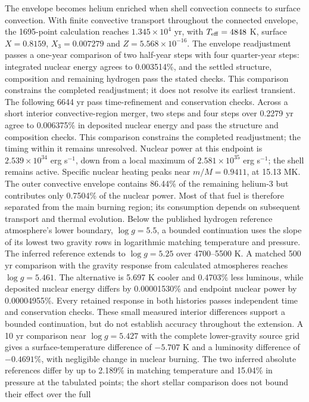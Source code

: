 \documentclass[11pt,letterpaper]{article}
\begin{document}
The envelope becomes helium enriched when shell convection connects to
surface convection. With finite convective transport throughout the connected
envelope, the 1695-point calculation reaches $1.345\times10^4$ yr, with
$T_{\rm eff}=4848$ K, surface $X=0.8159$, $X_3=0.007279$ and
$Z=5.568\times10^{-16}$. The envelope readjustment passes a one-year
comparison of two half-year steps with four quarter-year steps: integrated
nuclear energy agrees to 0.003514\%, and the settled structure, composition
and remaining hydrogen pass the stated checks. This comparison constrains
the completed readjustment; it does not resolve its earliest transient.
The following 6644 yr pass time-refinement and conservation checks. Across
a short interior convective-region merger, two steps and four steps over
0.2279 yr agree to 0.006375\% in deposited nuclear energy and pass the
structure and composition checks. This comparison constrains the completed
readjustment; the timing within it remains unresolved. Nuclear power at this endpoint is
$2.539\times10^{34}$ erg s$^{-1}$, down from a local maximum of
$2.581\times10^{35}$ erg s$^{-1}$; the shell remains active.
Specific nuclear heating peaks near $m/M=0.9411$, at 15.13 MK.
The outer convective envelope contains 86.44\% of the remaining helium-3
but contributes only 0.7504\% of the nuclear power. Most of that fuel is
therefore separated from the main burning region; its consumption depends
on subsequent transport and thermal evolution.
Below the published hydrogen reference atmosphere's lower boundary,
$\log g=5.5$, a bounded continuation uses the slope of its lowest two
gravity rows in logarithmic matching temperature and pressure.
The inferred reference extends to $\log g=5.25$ over 4700--5500 K.
A matched 500 yr comparison with the gravity response from calculated
atmospheres reaches $\log g=5.461$. The alternative is 5.697 K cooler and
0.4703\% less luminous, while deposited nuclear energy differs by
0.00001530\% and endpoint nuclear power by 0.00004955\%.
Every retained response in both histories passes independent time and
conservation checks. These small measured interior differences support a
bounded continuation, but do not establish accuracy throughout the extension.
A 10 yr comparison near $\log g=5.427$ with the complete lower-gravity
source grid gives a surface-temperature difference of $-5.707$ K and a
luminosity difference of $-0.4691\%$, with negligible change in nuclear
burning. The two inferred absolute references differ by up to 2.189\%
in matching temperature and 15.04\% in pressure at the tabulated points;
the short stellar comparison does not bound their effect over the full
\end{document}

